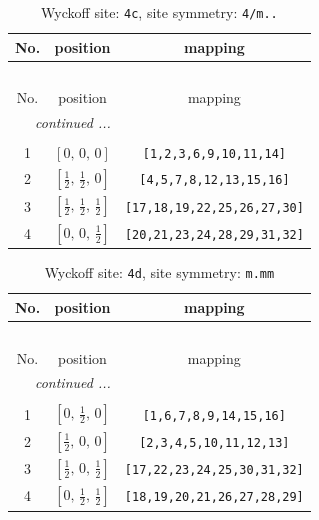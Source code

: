 \documentclass[fleqn,8pt]{jsarticle}
\begin{document}
\renewcommand{\arraystretch}{1.2}
\begin{longtable}{ccc}
\caption{Wyckoff site: {\tt 4c}, site symmetry: {\tt 4/m..}}
 \\
 \hline \hline
No. & position & mapping \\ \hline \endfirsthead

\multicolumn{2}{l}{\tablename\ \thetable{}} \\
 \hline \hline
No. & position & mapping \\ \hline \endhead

 \hline \hline
\multicolumn{2}{r}{\footnotesize\it continued ...} \\ \endfoot

 \hline \hline
\multicolumn{2}{r}{} \\ \endlastfoot

1 & $\left[ 0,\, 0,\, 0 \right]$ & {\tt [1,2,3,6,9,10,11,14]} \\ \hline
2 & $\left[ \frac{1}{2},\, \frac{1}{2},\, 0 \right]$ & {\tt [4,5,7,8,12,13,15,16]} \\ \hline
3 & $\left[ \frac{1}{2},\, \frac{1}{2},\, \frac{1}{2} \right]$ & {\tt [17,18,19,22,25,26,27,30]} \\ \hline
4 & $\left[ 0,\, 0,\, \frac{1}{2} \right]$ & {\tt [20,21,23,24,28,29,31,32]} \\
\end{longtable}
\renewcommand{\arraystretch}{1.2}
\begin{longtable}{ccc}
\caption{Wyckoff site: {\tt 4d}, site symmetry: {\tt m.mm}}
 \\
 \hline \hline
No. & position & mapping \\ \hline \endfirsthead

\multicolumn{2}{l}{\tablename\ \thetable{}} \\
 \hline \hline
No. & position & mapping \\ \hline \endhead

 \hline \hline
\multicolumn{2}{r}{\footnotesize\it continued ...} \\ \endfoot

 \hline \hline
\multicolumn{2}{r}{} \\ \endlastfoot

1 & $\left[ 0,\, \frac{1}{2},\, 0 \right]$ & {\tt [1,6,7,8,9,14,15,16]} \\ \hline
2 & $\left[ \frac{1}{2},\, 0,\, 0 \right]$ & {\tt [2,3,4,5,10,11,12,13]} \\ \hline
3 & $\left[ \frac{1}{2},\, 0,\, \frac{1}{2} \right]$ & {\tt [17,22,23,24,25,30,31,32]} \\ \hline
4 & $\left[ 0,\, \frac{1}{2},\, \frac{1}{2} \right]$ & {\tt [18,19,20,21,26,27,28,29]} \\
\end{longtable}
\end{document}

